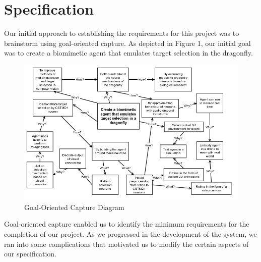\documentclass[a4paper,11pt]{article}
\begin{document}
\clearpage
\section{Specification}

Our initial approach to establishing the requirements for this project was to brainstorm using goal-oriented capture. As depicted in Figure 1, our initial goal was to create a biomimetic agent that emulates target selection in the dragonfly. 
	
	\begin{figure}[h]
	\begin{center}
	\includegraphics[scale = 0.5]{goalorient}
	\end{center}
	\caption{Goal-Oriented Capture Diagram}
	\end{figure}	
	
	Goal-oriented capture enabled us to identify the minimum requirements for the completion of our project. As we progressed in the development of the system, we ran into some complications that motivated us to modify the certain aspects of our specification. 
\end{document}
